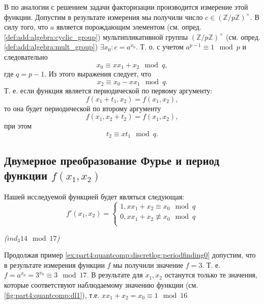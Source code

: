 В по аналогии с решением задачи факторизации производится измерение
этой функции. Допустим в результате измерения мы получили число $c \in
\left(\mathbb{Z}/p\mathbb{Z}\right)^\times$. В силу того, что $a$
является порождающим элементом (см. опред.
\ref{def:add:algebra:cyclic_group}) мультипликативной группы   
$\left(\mathbb{Z}/p\mathbb{Z}\right)^\times$ (см. опред.
\ref{def:add:algebra:mult_group}) $\exists x_0: c = a^{x_0}$. Т. о. с
учетом  $a^{p-1}
\equiv 1 \mod p$ и следовательно
\[
x_0 \equiv x x_1 + x_2 \mod q,
\] 
где $q = p - 1$.
Из этого выражения следует, что
\[
x_2 \equiv x_0 - x x_1 \mod q.
\]
Т. е. если функция является периодической по первому аргументу:
\[
f(x_1 + t_1, x_2) = f(x_1,x_2),
\]
то она будет периодической по второму аргументу
\[
f(x_1, x_2 + t_2) = f(x_1,x_2),
\]
при этом 
\begin{equation}
t_2 \equiv x t_1 \mod q.
\label{eq:part4:quantcomp:discretlogeq}
\end{equation}

\subsection{Двумерное преобразование Фурье и период функции $f(x_1,
  x_2)$}
Нашей исследуемой функцией будет являться следующая:
\[
f'\left(x_1, x_2\right) = 
\begin{cases}
1, x x_1 + x_2 \equiv x_0 \mod q \\
0, x x_1 + x_2 \not\equiv x_0 \mod q \\
\end{cases}
\]
\begin{example}
\emph{($ind_3{14} \mod{17}$)}
%


Продолжая пример \ref{ex:part4:quantcomp:discretlog:periodfinding0}
допустим, что в результате измерения функции $f$ мы получили значение
$f = 3$. Т. е. $f = a^{x_0} = 3^{x_0} \equiv 3 \mod 17$.  
В результате для $x_1, x_2$ останутся только те значения, 
которые соответствуют наблюдаемому значению функции (см.
\autoref{fig:part4:quantcomp:dl1}), т.е. $x x_1 + x_2 = x_0 \equiv 1
\mod 16$ 
\label{ex:part4:quantcomp:discretlog:periodfinding1}
\end{example}


